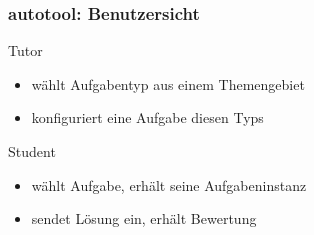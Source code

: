 \begin{frame}
  \frametitle{autotool: Benutzersicht}

  Tutor
  \begin{itemize}
  \item wählt Aufgabentyp aus einem Themengebiet
  \item konfiguriert eine Aufgabe diesen Typs
  \end{itemize}

  Student
  \begin{itemize}
  \item wählt Aufgabe,
    erhält seine Aufgabeninstanz
  \item sendet Lösung ein,
    erhält Bewertung
  \end{itemize}
\end{frame}
